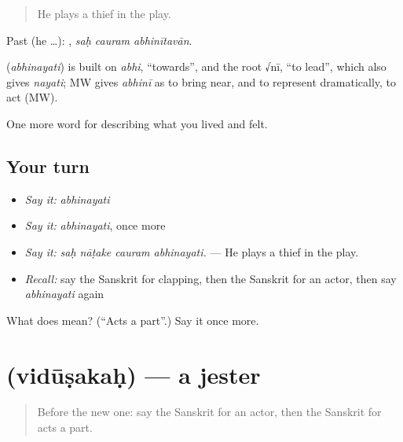 \begin{quote}
He plays a thief in the play.
\end{quote}

Past (he …):   , \emph{saḥ cauram abhinītavān}.

\begin{cousinweb}
\textbf{} (\emph{abhinayati}) is built on \emph{abhi}, \textquotedblleft{}towards\textquotedblright{}, and the root √nī, \textquotedblleft{}to lead\textquotedblright{}, which also gives \emph{nayati}; MW gives \emph{abhinī} as to bring near, and to represent dramatically, to act (MW).
\end{cousinweb}

\begin{grammarlens}[title={What you've built}]
One more word for describing what you lived and felt.
\end{grammarlens}

\subsection*{Your turn}
\begin{itemize}
\raggedright
  \item \emph{Say it:} \emph{abhinayati}
  \item \emph{Say it:} \emph{abhinayati}, once more
  \item \emph{Say it:} \emph{saḥ nāṭake cauram abhinayati.} — He plays a thief in the play.
  \item \emph{Recall:} say the Sanskrit for clapping, then the Sanskrit for an actor, then say \emph{abhinayati} again
\end{itemize}

\begin{tcolorbox}[breakable,colback=teal!4,colframe=teal!35!black,title={Before you move on}]
What does  mean? (\textquotedblleft{}Acts a part\textquotedblright{}.) Say it once more.
\end{tcolorbox}
\section[\texorpdfstring{\sk{विदूषकः} (vidūṣakaḥ)}{विदूषकः (vidūṣakaḥ)}]{ (vidūṣakaḥ) — a jester}

\label{lesson:SA-C523-vidusakah}



\begin{quote}
Before the new one: say the Sanskrit for an actor, then the Sanskrit for acts a part.
\end{quote}

